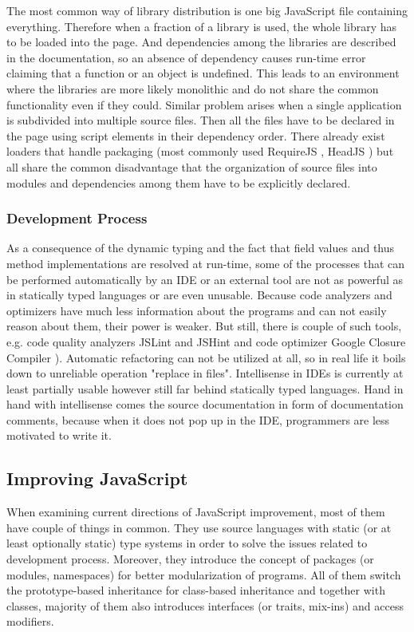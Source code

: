 \documentclass[12pt,a4paper]{report}
\begin{document}
The most common way of library distribution is one big JavaScript file containing everything. Therefore when a fraction of a library is used, the whole library has to be loaded into the page. And dependencies among the libraries are described in the documentation, so an absence of dependency causes run-time error claiming that a function or an object is undefined. This leads to an environment where the libraries are more likely monolithic and do not share the common functionality even if they could. Similar problem arises when a single application is subdivided into multiple source files. Then all the files have to be declared in the page using script elements in their dependency order. There already exist loaders that handle packaging (most commonly used RequireJS \cite{RequireJs}, HeadJS \cite{HeadJs}) but all share the common disadvantage that the organization of source files into modules and dependencies among them have to be explicitly declared.

\subsubsection*{Development Process} 

As a consequence of the dynamic typing and the fact that field values and thus method implementations are resolved at run-time, some of the processes that can be performed automatically by an IDE or an external tool are not as powerful as in statically typed languages or are even unusable. Because code analyzers and optimizers have much less information about the programs and can not easily reason about them, their power is weaker. But still, there is couple of such tools, e.g. code quality analyzers JSLint \cite{JsLint} and JSHint \cite{JsHint} and code optimizer Google Closure Compiler \cite{GoogleClosure}). Automatic refactoring can not be utilized at all, so in real life it boils down to unreliable operation "replace in files". Intellisense in IDEs is currently at least partially usable however still far behind statically typed languages. Hand in hand with intellisense comes the source documentation in form of documentation comments, because when it does not pop up in the IDE, programmers are less motivated to write it.

\subsection{Improving JavaScript}

When examining current directions of JavaScript improvement, most of them have couple of things in common. They use source languages with static (or at least optionally static) type systems in order to solve the issues related to development process. Moreover, they introduce the concept of packages (or modules, namespaces) for better modularization of programs. All of them switch the prototype-based inheritance for class-based inheritance and together with classes, majority of them also introduces interfaces (or traits, mix-ins) and access modifiers.
\end{document}
